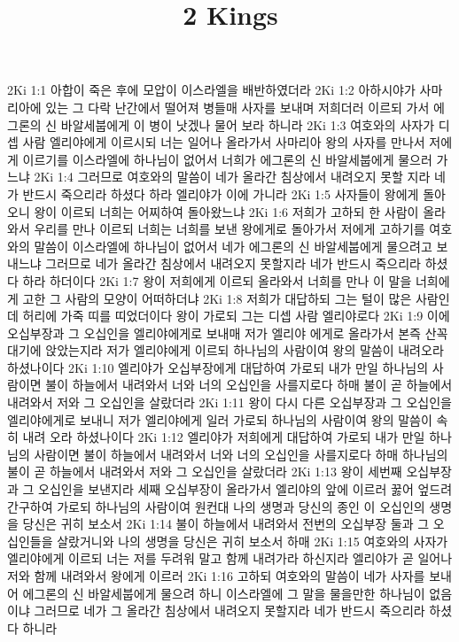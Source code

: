 

\title{2 Kings}

2Ki 1:1  아합이 죽은 후에 모압이 이스라엘을 배반하였더라
2Ki 1:2  아하시야가 사마리아에 있는 그 다락 난간에서 떨어져 병들매 사자를 보내며 저희더러 이르되 가서 에그론의 신 바알세붑에게 이 병이 낫겠나 물어 보라 하니라
2Ki 1:3  여호와의 사자가 디셉 사람 엘리야에게 이르시되 너는 일어나 올라가서 사마리아 왕의 사자를 만나서 저에게 이르기를 이스라엘에 하나님이 없어서 너희가 에그론의 신 바알세붑에게 물으러 가느냐
2Ki 1:4  그러므로 여호와의 말씀이 네가 올라간 침상에서 내려오지 못할 지라 네가 반드시 죽으리라 하셨다 하라 엘리야가 이에 가니라
2Ki 1:5  사자들이 왕에게 돌아오니 왕이 이르되 너희는 어찌하여 돌아왔느냐
2Ki 1:6  저희가 고하되 한 사람이 올라와서 우리를 만나 이르되 너희는 너희를 보낸 왕에게로 돌아가서 저에게 고하기를 여호와의 말씀이 이스라엘에 하나님이 없어서 네가 에그론의 신 바알세붑에게 물으려고 보내느냐 그러므로 네가 올라간 침상에서 내려오지 못할지라 네가 반드시 죽으리라 하셨다 하라 하더이다
2Ki 1:7  왕이 저희에게 이르되 올라와서 너희를 만나 이 말을 너희에게 고한 그 사람의 모양이 어떠하더냐
2Ki 1:8  저희가 대답하되 그는 털이 많은 사람인데 허리에 가죽 띠를 띠었더이다 왕이 가로되 그는 디셉 사람 엘리야로다
2Ki 1:9  이에 오십부장과 그 오십인을 엘리야에게로 보내매 저가 엘리야 에게로 올라가서 본즉 산꼭대기에 앉았는지라 저가 엘리야에게 이르되 하나님의 사람이여 왕의 말씀이 내려오라 하셨나이다
2Ki 1:10  엘리야가 오십부장에게 대답하여 가로되 내가 만일 하나님의 사람이면 불이 하늘에서 내려와서 너와 너의 오십인을 사를지로다 하매 불이 곧 하늘에서 내려와서 저와 그 오십인을 살랐더라
2Ki 1:11  왕이 다시 다른 오십부장과 그 오십인을 엘리야에게로 보내니 저가 엘리야에게 일러 가로되 하나님의 사람이여 왕의 말씀이 속히 내려 오라 하셨나이다
2Ki 1:12  엘리야가 저희에게 대답하여 가로되 내가 만일 하나님의 사람이면 불이 하늘에서 내려와서 너와 너의 오십인을 사를지로다 하매 하나님의 불이 곧 하늘에서 내려와서 저와 그 오십인을 살랐더라
2Ki 1:13  왕이 세번째 오십부장과 그 오십인을 보낸지라 세째 오십부장이 올라가서 엘리야의 앞에 이르러 꿇어 엎드려 간구하여 가로되 하나님의 사람이여 원컨대 나의 생명과 당신의 종인 이 오십인의 생명을 당신은 귀히 보소서
2Ki 1:14  불이 하늘에서 내려와서 전번의 오십부장 둘과 그 오십인들을 살랐거니와 나의 생명을 당신은 귀히 보소서 하매
2Ki 1:15  여호와의 사자가 엘리야에게 이르되 너는 저를 두려워 말고 함께 내려가라 하신지라 엘리야가 곧 일어나 저와 함께 내려와서 왕에게 이르러
2Ki 1:16  고하되 여호와의 말씀이 네가 사자를 보내어 에그론의 신 바알세붑에게 물으려 하니 이스라엘에 그 말을 물을만한 하나님이 없음이냐 그러므로 네가 그 올라간 침상에서 내려오지 못할지라 네가 반드시 죽으리라 하셨다 하니라
